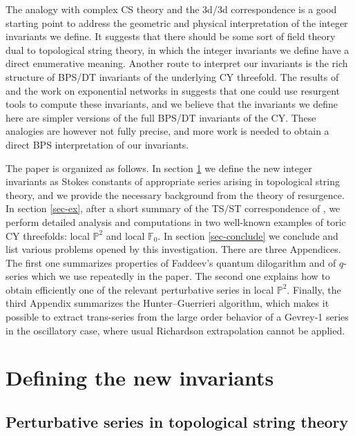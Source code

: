 \documentclass[a4paper,11pt]{article}
\theoremstyle{definition}
\def\IP{{\mathbb P}}
\def\IF{{\mathbb F}}
\begin{document}
The analogy with complex CS theory and the 3d/3d correspondence \cite{DGG1} is a good starting point to address the geometric and 
physical interpretation of the integer invariants we define. It suggests that there should be some sort of field theory dual to 
topological string theory, in which the integer invariants we define have a direct enumerative meaning. Another route to interpret our invariants 
is the rich structure of BPS/DT invariants of the underlying CY threefold. The results of \cite{bridgeland} and the work on 
exponential networks in \cite{esw,blr1,blr2, blr3, longhi} suggests that one could use 
resurgent tools to compute these invariants, and we believe that the invariants we define here are simpler versions of the full 
BPS/DT invariants of the CY. These analogies are however not fully precise, and more work is needed to obtain a direct BPS interpretation of our invariants. 

The paper is organized as follows. In section \ref{sec-definition} we define the new integer invariants as Stokes constants of appropriate 
series arising in topological string theory, and we provide the necessary background from the theory of resurgence. In section \ref{sec-ex}, after 
a short summary of the TS/ST correspondence of \cite{ghm,cgm}, we perform detailed analysis and computations in two well-known examples of toric CY threefolds: local $\IP^2$ and local $\IF_0$. In section \ref{sec-conclude} we conclude and list various problems opened by this investigation. 
There are three Appendices. The first one summarizes properties of Faddeev's quantum dilogarithm and of $q$-series which we use repeatedly in the paper. The second one explains how to obtain efficiently one of the relevant perturbative series in local $\IP^2$. Finally, the third Appendix summarizes the Hunter--Guerrieri algorithm, which makes it possible to extract trans-series from the large order behavior of a Gevrey-1 
series in the oscillatory case, where usual Richardson extrapolation cannot be applied. 

\section{Defining the new invariants}
\label{sec-definition}

\subsection{Perturbative series in topological string theory}
\end{document}
